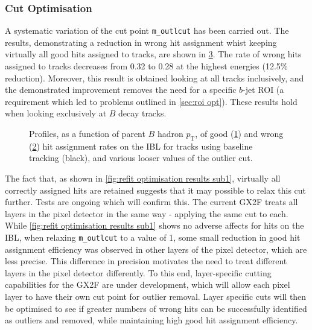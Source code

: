 \subsubsection{Cut Optimisation}\label{sec:cut opt}
A systematic variation of the cut point \texttt{m\_outlcut} has been carried out. The results, demonstrating a reduction in wrong hit assignment whist keeping virtually all good hits assigned to tracks, are shown in \cref{fig:outlier cut scan}. The rate of wrong hits assigned to tracks decreases from 0.32 to 0.28 at the highest energies (12.5\% reduction). Moreover, this result is obtained looking at all tracks inclusively, and the demonstrated improvement removes the need for a specific $b$-jet ROI (a requirement which led to problems outlined in \cref{sec:roi opt}). These results hold when looking exclusively at $B$ decay tracks.
%
\begin{figure}[!htbp]
    \centering
    \begin{subfigure}{.5\textwidth}
      \centering
      \caption{}
      \label{fig:outlier cut scan sub1}
    \end{subfigure}%
    \begin{subfigure}{.5\textwidth}
      \centering
      \caption{}
      \label{fig:outlier cut scan sub2}
    \end{subfigure}
    \caption{Profiles, as a function of parent $B$ hadron $p_{\text{T}}$, of good (\cref{fig:outlier cut scan sub1}) and wrong (\cref{fig:outlier cut scan sub2}) hit assignment rates on the IBL for tracks using baseline tracking (black), and various looser values of the outlier cut.}
    \label{fig:outlier cut scan}
\end{figure}
%
The fact that, as shown in \cref{fig:refit optimisation results sub1}, virtually all correctly assigned hits are retained suggests that it may possible to relax this cut further. Tests are ongoing which will confirm this. The current GX2F treats all layers in the pixel detector in the same way - applying the same cut to each. While \cref{fig:refit optimisation results sub1} shows no adverse affects for hits on the IBL, when relaxing \texttt{m\_outlcut} to a value of 1, some small reduction in good hit assignment efficiency was observed in other layers of the pixel detector, which are less precise. This difference in precision motivates the need to treat different layers in the pixel detector differently. To this end, layer-specific cutting capabilities for the GX2F are under development, which will allow each pixel layer to have their own cut point for outlier removal. Layer specific cuts will then be optimised to see if greater numbers of wrong hits can be successfully identified as outliers and removed, while maintaining high good hit assignment efficiency.
